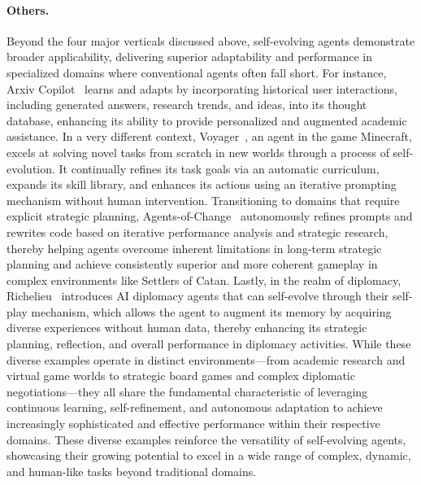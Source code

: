 \documentclass[10pt]{article} %
\begin{document}
\paragraph{Others.}
Beyond the four major verticals discussed above, self-evolving agents demonstrate broader applicability, delivering superior adaptability and performance in specialized domains where conventional agents often fall short. 
For instance, Arxiv Copilot~\citep{lin2024arxivcopilot} learns and adapts by incorporating historical user interactions, including generated answers, research trends, and ideas, into its thought database, enhancing its ability to provide personalized and augmented academic assistance. 
In a very different context, Voyager~\citep{wang2023voyager}, an agent in the game Minecraft, excels at solving novel tasks from scratch in new worlds through a process of self-evolution. It continually refines its task goals via an automatic curriculum, expands its skill library, and enhances its actions using an iterative prompting mechanism without human intervention. Transitioning to domains that require explicit strategic planning, Agents-of-Change~\citep{belle2025agents} autonomously refines prompts and rewrites code based on iterative performance analysis and strategic research, thereby helping agents overcome inherent limitations in long-term strategic planning and achieve consistently superior and more coherent gameplay in complex environments like Settlers of Catan. Lastly, in the realm of diplomacy, Richelieu~\citep{zhao2024richelieu} introduces AI diplomacy agents that can self-evolve through their self-play mechanism, which allows the agent to augment its memory by acquiring diverse experiences without human data, thereby enhancing its strategic planning, reflection, and overall performance in diplomacy activities. While these diverse examples operate in distinct environments—from academic research and virtual game worlds to strategic board games and complex diplomatic negotiations—they all share the fundamental characteristic of leveraging continuous learning, self-refinement, and autonomous adaptation to achieve increasingly sophisticated and effective performance within their respective domains. 
These diverse examples reinforce the versatility of self-evolving agents, showcasing their growing potential to excel in a wide range of complex, dynamic, and human-like tasks beyond traditional domains.

 

\end{document}
